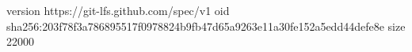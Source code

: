 version https://git-lfs.github.com/spec/v1
oid sha256:203f78f3a786895517f0978824b9fb47d65a9263e11a30fe152a5edd44defe8e
size 22000
